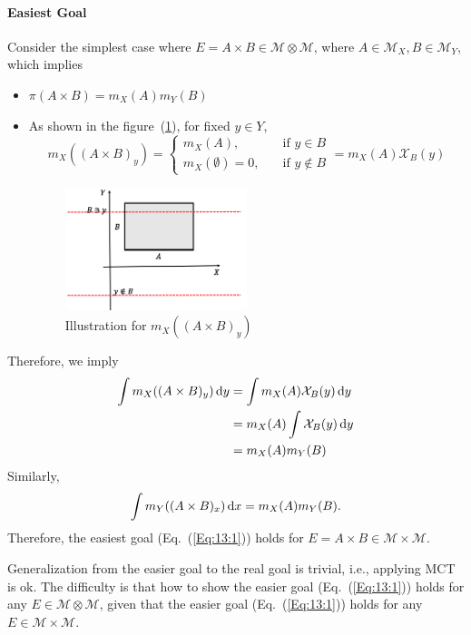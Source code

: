 \paragraph{Easiest Goal}
Consider the simplest case where 
$E=A\times B\in\mathcal{M}\otimes\mathcal{M}$, where $A\in\mathcal{M}_X,B\in\mathcal{M}_Y$,
which implies
\begin{itemize}
\item
$\pi(A\times B) = m_X(A)m_Y(B)$
\item
As shown in the figure~(\ref{fig:13:1}), for fixed $y\in Y$,
\[
m_X((A\times B)_y)
=
\left\{
\begin{aligned}
m_X(A),&\quad\text{if $y\in B$}\\
m_X(\emptyset)=0,&\quad\text{if $y\notin B$}
\end{aligned}
\right.
=
m_X(A)\mathcal{X}_B(y)
\]
\begin{figure}[H]
\centering
\includegraphics[width=0.5\textwidth]{week13/f_20}
\caption{Illustration for $m_X((A\times B)_y)$}
\label{fig:13:1}
\end{figure}
\end{itemize}
Therefore, we imply
\begin{align*}
\int m_X((A\times B)_y)\,\mathrm{d} y  &= \int m_X(A)\mathcal{X}_B(y)\,\mathrm{d} y\\
&=
m_X(A)\int \mathcal{X}_B(y)\,\mathrm{d} y\\
&=m_X(A)m_Y(B)
\end{align*}
Similarly,
\[
\int m_Y((A\times B)_x)\,\mathrm{d} x = m_X(A)m_Y(B).
\]
Therefore, the easiest goal (Eq.~(\ref{Eq:13:1})) holds for $E=A\times B\in \mathcal{M}\times\mathcal{M}$.

\begin{remark}
Generalization from the easier goal to the real goal is trivial, i.e., applying MCT is ok.
The difficulty is that how to show the easier goal (Eq.~(\ref{Eq:13:1})) holds for any $E\in\mathcal{M}\otimes\mathcal{M}$, given that the easier goal (Eq.~(\ref{Eq:13:1})) holds for any $E\in \mathcal{M}\times\mathcal{M}$.
\end{remark}

